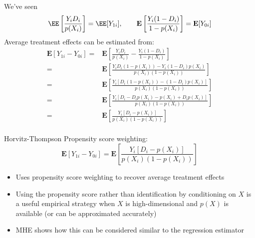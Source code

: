 \documentclass[compress, 8pt]{beamer}
\begin{document}
\begin{frame}{}

We've seen
\begin{equation*}
\EE \left[ \frac{Y_i D_i}{p(X_i)} \right] = \EE [Y_{1i}],
\quad \quad
    \mathbf{E} \left[ \frac{Y_i (1 - D_i)}{1 - p(X_i)} \right] = \mathbf{E} [Y_{0i}]
\end{equation*}
Average treatment effects can be estimated from:
\begin{align*}
\mathbf{E} [Y_{1i} - Y_{0i}]
=& \mathbf{E} 
\left[ 
    \frac{Y_i D_i}{p(X_i)}
    - \frac{Y_i (1 - D_i)}{1 - p(X_i)}
\right] \\
=& \mathbf{E} \left[ \frac{Y_i D_i (1 - p(X_i)) - Y_i (1 - D_i) p(X_i)}{p(X_i) (1 - p(X_i))} \right] \\
=& \mathbf{E} \left[ \frac{Y_i \left[ D_i (1 - p(X_i)) - (1 - D_i) p(X_i) \right]}{p(X_i) (1 - p(X_i))} \right] \\
=& \mathbf{E} \left[ \frac{Y_i \left[ D_i - D_i p(X_i) - p(X_i) +  D_i p(X_i) \right]}{p(X_i) (1 - p(X_i))} \right] \\
=& \mathbf{E} \left[ \frac{Y_i \left[ D_i - p(X_i) \right]}{p(X_i) (1 - p(X_i))} \right] \\
\end{align*}

\end{frame}

\begin{frame}{}

Horvitz-Thompson Propensity score weighting:
\begin{equation*}
    \mathbf{E} [Y_{1i} - Y_{0i}]
    = \mathbf{E} \left[ \frac{Y_i \left[ D_i - p(X_i) \right]}{p(X_i) (1 - p(X_i))} \right]
\end{equation*}
\begin{itemize}
    \item Uses propensity score weighting to recover average treatment effects
    \item Using the propensity score rather than identification by conditioning on $X$ is a useful empirical strategy when $X$ is high-dimensional and $p(X)$ is available (or can be approximated accurately)
    \item MHE shows how this can be considered similar to the regression estimator
\end{itemize}


\end{frame}
\end{document}
